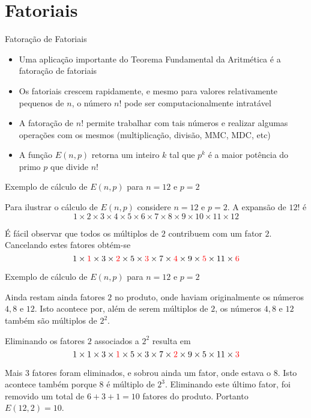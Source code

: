 \section{Fatoriais}

\begin{frame}[fragile]{Fatoração de Fatoriais}

    \begin{itemize}
        \item Uma aplicação importante do Teorema Fundamental da Aritmética é a fatoração de
            fatoriais

        \item Os fatoriais crescem rapidamente, e mesmo para valores relativamente pequenos de $n$, 
            o número $n!$ pode ser computacionalmente intratável

        \item A fatoração de $n!$ permite trabalhar com tais números e realizar algumas operações 
            com os mesmos (multiplicação, divisão, MMC, MDC, etc)

        \item A função $E(n,p)$ retorna um inteiro $k$ tal que $p^k$ é a maior potência do primo 
            $p$ que divide $n!$
    \end{itemize}

\end{frame}

\begin{frame}[fragile]{Exemplo de cálculo de $E(n, p)$ para $n = 12$ e $p = 2$}

Para ilustrar o cálculo de $E(n,p)$ considere $n = 12$ e $p = 2$. A expansão de $12!$ é 
$$
        1 \times 2 \times 3 \times 4 \times 5 \times 6 \times 7 \times 8 \times 9 \times 10 \times 11 \times 12
$$

É fácil observar que todos os múltiplos de $2$ contribuem com um fator $2$. Cancelando estes fatores obtém-se
$$
        1 \times \textcolor{red}{1} \times 3 \times \textcolor{red}{2} \times 5 \times \textcolor{red}{3} \times 7 \times \textcolor{red}{4} \times 9 \times \textcolor{red}{5} \times 11 \times \textcolor{red}{6}
$$

\end{frame}

\begin{frame}[fragile]{Exemplo de cálculo de $E(n, p)$ para $n = 12$ e $p = 2$}

Ainda restam ainda fatores $2$ no produto, onde haviam originalmente os números $4, 8$ e $12$. Isto acontece por, além de serem múltiplos de $2$, os números $4, 8$ e $12$ também são múltiplos de $2^2$. 

Eliminando os fatores $2$ associados a $2^2$ resulta em
$$
        1 \times 1 \times 3 \times \textcolor{red}{1} \times 5 \times 3 \times 7 \times \textcolor{red}{2} \times 9 \times 5 \times 11 \times \textcolor{red}{3}
$$

Mais $3$ fatores foram eliminados, e sobrou ainda um fator, onde estava o $8$. Isto acontece também porque 8 é múltiplo de $2^3$. Eliminando este último fator, foi removido um total de $6 + 3 + 1 = 10$ fatores do produto.  Portanto $E(12,2) = 10$.

\end{frame}

